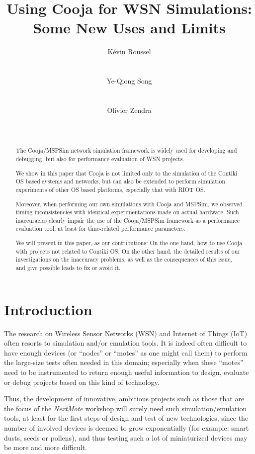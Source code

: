 \documentclass[10pt]{ewsn-proc}
\author{
\alignauthor K\'evin Roussel \\
        \affaddr{INRIA Nancy Grand-Est}\\
        \affaddr{615, rue du Jardin Botanique}\\
        \affaddr{54600 Villers-l\`es-Nancy, France}
       \email{kevin.roussel@inria.fr}
\alignauthor Ye-Qiong Song \\
        \affaddr{LORIA/INRIA Nancy Grand-Est}\\
        \affaddr{615, rue du Jardin Botanique}\\
        \affaddr{54600 Villers-l\`es-Nancy, France}
       \email{ye-qiong.song@loria.fr}
\alignauthor Olivier Zendra \\
        \affaddr{INRIA Nancy Grand-Est}\\
        \affaddr{615, rue du Jardin Botanique}\\
        \affaddr{54600 Villers-l\`es-Nancy, France}
       \email{olivier.zendra@inria.fr}
}
\title{Using Cooja for WSN Simulations: Some New Uses and Limits}
\begin{document}
\maketitle


\begin{abstract}
The Cooja/MSPSim network simulation framework is widely used for developing
and debugging, but also for performance evaluation of WSN projects.

We show in this paper that Cooja is not limited only to the simulation
of the Contiki OS based systems and networks, but can also be extended 
to perform simulation experiments of other OS based platforms, especially
that with RIOT OS.

Moreover, when performing our own simulations with Cooja and MSPSim,
we observed timing inconsistencies with identical experimentations made
on actual hardware. Such inaccuracies clearly impair the use of the
Cooja/MSPSim framework as a performance evaluation tool, at least
for time-related performance parameters.

We will present in this paper, as our contributions: On the one hand,
how to use Cooja with projects not related to Contiki OS;
On the other hand, the detailed results of our investigations on the
inaccuracy problems, as well as the consequences of this issue, and give
possible leads to fix or avoid it.
\end{abstract}



\section{Introduction}
\label{introduction}

The research on Wireless Sensor Networks (WSN) and Internet of Things (IoT)
often resorts to simulation and/or emulation tools. It is indeed often
difficult to have enough devices (or ``nodes'' or ``motes'' as one might
call them) to perform the large-size tests often needed in this domain;
especially when these ``motes'' need to be instrumented to return enough
useful information to design, evaluate or debug projects based on this
kind of technology.

Thus, the development of innovative, ambitious projects such as those
that are the focus of the \emph{NextMote} workshop will surely need
such simulation/emulation tools, at least for the first steps of design
and test of new technologies, since the number of involved devices is
deemed to grow exponentially (for example: smart dusts, seeds or pollens),
and thus testing such a lot of miniaturized devices may be more and more
difficult.
\end{document}
